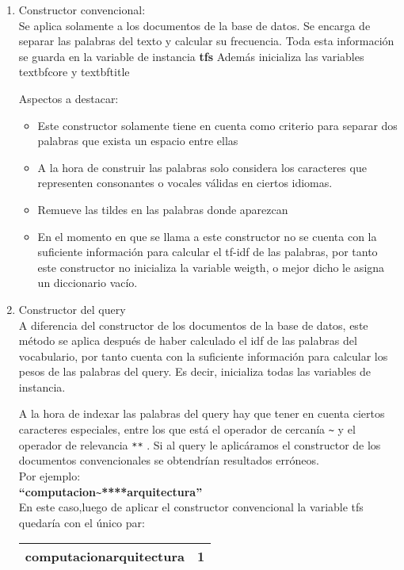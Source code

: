 \documentclass[12pt]{article}
\begin{document}
 \begin {enumerate}
  \item Constructor convencional: \\
  Se aplica solamente a los documentos de la base de datos. Se encarga de separar las palabras del texto y calcular su frecuencia. Toda esta informaci\'on se guarda en la variable de instancia \textbf{tfs}
  Adem\'as inicializa las variables textbf{core} y  textbf{title}
  
  Aspectos a destacar:
  \begin{itemize}
  \item  Este constructor solamente tiene en cuenta como criterio para separar dos palabras que exista un espacio entre ellas
  \item A la hora de construir las palabras solo considera los caracteres que representen consonantes o vocales v\'alidas en ciertos idiomas. 
  \item Remueve las tildes en las palabras donde aparezcan 
  \item En el momento en que se llama a este constructor no se cuenta con la suficiente informaci\'on para calcular el tf-idf de las palabras, por tanto este constructor no inicializa la variable weigth, o mejor dicho le asigna un diccionario vac\'io.
 \end{itemize}
  
  \item Constructor del query \\
  A diferencia del constructor de los documentos de la base de datos, este m\'etodo se aplica despu\'es de haber calculado el idf de las palabras del vocabulario, por tanto cuenta con la suficiente informaci\'on para calcular los pesos de las palabras del query. Es decir, inicializa todas las variables de instancia.
  
   A la hora de indexar las palabras del query hay que tener en cuenta ciertos caracteres especiales, entre los que est\'a el operador de cercan\'ia \verb|~| y el operador de relevancia \verb|**| . Si al query le aplic\'aramos el constructor de los documentos convencionales se obtendr\'ian resultados err\'oneos. \\
Por ejemplo: \\
 \textbf{ “computacion}\verb|~|\textbf{****arquitectura”}\\

 En este caso,luego de aplicar el constructor convencional la variable tfs quedar\'ia con el \'unico par:
 \begin{tabular}{|r|l|}
 \hline
computacionarquitectura  &  1 \\
\hline
 \end{tabular}


\end{enumerate}
\end{document}
